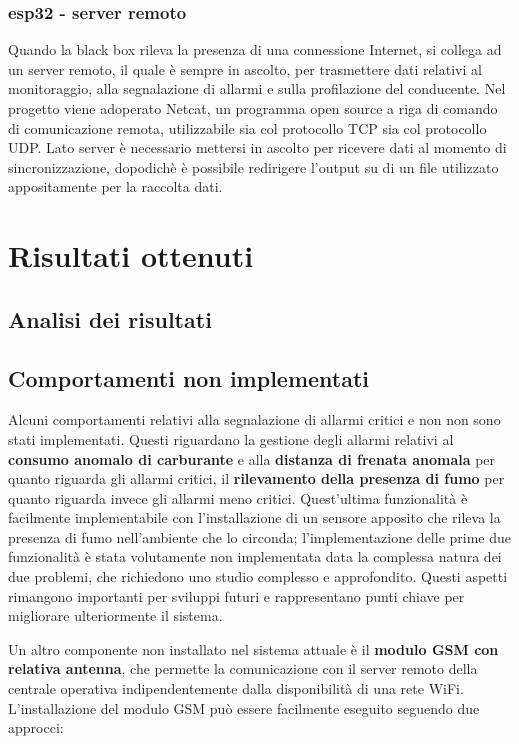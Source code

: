\documentclass[12pt, a4paper, italian]{report}
\numberwithin{figure}{chapter}
\numberwithin{table}{chapter}
\begin{document}
\subsection{esp32 - server remoto}
Quando la black box rileva la presenza di una connessione Internet, si collega ad un server remoto, il quale è sempre in ascolto, per trasmettere dati relativi al monitoraggio, alla segnalazione di allarmi e sulla profilazione del conducente. 
Nel progetto viene adoperato Netcat, un programma open source a riga di comando di comunicazione remota, utilizzabile sia col protocollo TCP sia col protocollo UDP. Lato server è necessario mettersi in ascolto per ricevere dati al momento di sincronizzazione, dopodichè è possibile redirigere l'output su di un file utilizzato appositamente per la raccolta dati. \cite{Netcat}

\chapter{Risultati ottenuti}
\section{Analisi dei risultati}
\section{Comportamenti non implementati}
Alcuni comportamenti relativi alla segnalazione di allarmi critici e non non sono stati implementati. Questi riguardano la gestione degli allarmi relativi al \textbf{consumo anomalo di carburante} e alla \textbf{distanza di frenata anomala} per quanto riguarda gli allarmi critici, il \textbf{rilevamento della presenza di fumo} per quanto riguarda invece gli allarmi meno critici. Quest'ultima funzionalità è facilmente implementabile con l'installazione di un sensore apposito che rileva la presenza di fumo nell'ambiente che lo circonda; l'implementazione delle prime due funzionalità è stata volutamente non implementata data la complessa natura dei due problemi, che richiedono uno studio complesso e approfondito. Questi aspetti rimangono importanti per sviluppi futuri e rappresentano punti chiave per migliorare ulteriormente il sistema.

Un altro componente non installato nel sistema attuale è il \textbf{modulo GSM con relativa antenna}, che permette la comunicazione con il server remoto della centrale operativa indipendentemente dalla disponibilità di una rete WiFi.
L'installazione del modulo GSM può essere facilmente eseguito seguendo due approcci: 
\end{document}
